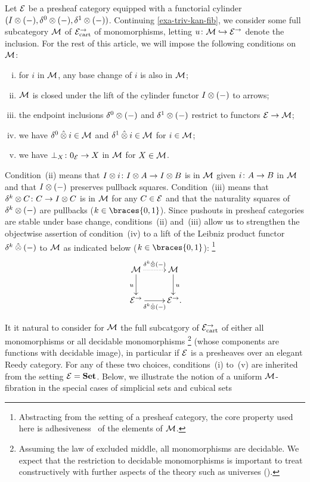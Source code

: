 \documentclass[reqno,10pt,a4paper,oneside,draft]{amsart}
\begin{document}
\begin{example} \label{uniform-fib-presheaf-cat}
Let $\catE$ be a presheaf category equipped with a functorial cylinder $(\interval \otimes (-), \lcyl \otimes (-), \rcyl \otimes (-))$.
Continuing \cref{exa-triv-kan-fib}, we consider some full subcategory $\cal{M}$ of $\catE_\cart^\to$ of monomorphisms, letting $u \co \cal{M} \hookrightarrow \catE^\to$ denote the inclusion.
For the rest of this article, we will impose the following conditions on $\cal{M}$:
\begin{enumerate}[(i)]
\item for $i$ in $\cal{M}$, any base change of $i$ is also in $\cal{M}$;
\item $\cal{M}$ is closed under the lift of the cylinder functor $\interval \otimes (-)$ to arrows;
\item the endpoint inclusions $\lcyl \otimes (-)$ and $\rcyl \otimes (-)$ restrict to functors $\catE \to \cal{M}$;
\item we have $\lcyl \hatotimes i \in \cal{M}$ and $\rcyl \hatotimes i \in \cal{M}$ for $i \in \cal{M}$;
\item we have $\bot_X \co 0_{\cal{E}} \to X$ in $\cal{M}$ for $X \in \cal{M}$.
\end{enumerate}
Condition~(ii) means that $\interval \otimes i \co \interval \otimes A \to \interval \otimes B$ is in $\cal{M}$ given $i \co A \to B$ in $\cal{M}$ and that $\interval \otimes (-)$ preserves pullback squares.
Condition~(iii) means that $\kcyl \otimes C \co C \to \interval \otimes C$ is in $\cal{M}$ for any $C \in \catE$ and that the naturality squares of $\kcyl \otimes (-)$ are pullbacks ($k \in \braces{0, 1}$).
Since pushouts in presheaf categories are stable under base change, conditions~(ii) and~(iii) allow us to strengthen the objectwise assertion of condition~(iv) to a lift of the Leibniz product functor $\kcyl \hatotimes (-)$ to $\cal{M}$ as indicated below ($k \in \braces{0, 1}$):%
\footnote{Abstracting from the setting of a presheaf category, the core property used here is adhesiveness~\cite{garner-lack:adhesive} of the elements of $\cal{M}$.}
\[
\xymatrix{
  \cal{M}
  \ar@{.>}[r]^{\kcyl \hatotimes (-)}
  \ar[d]_{u}
&
  \cal{M}
  \ar[d]^{u}
\\
  \catE^\to
  \ar[r]_{\kcyl \hatotimes (-)}
&
  \catE^\to
\rlap{.}}
\]

It it natural to consider for $\cal{M}$ the full subcatgory of $\catE_\cart^\to$ of either all monomorphisms or all decidable monomorphisms%
\footnote{
Assuming the law of excluded middle, all monomorphisms are decidable.
We expect that the restriction to decidable monomorphisms is important to treat constructively with further aspects of the theory such as universes (\cf \cite{cohen-et-al:cubicaltt}).
} (\ie whose components are functions with decidable image), in particular if $\calE$ is a presheaves over an elegant Reedy category.
For any of these two choices, conditions~(i) to~(v) are inherited from the setting $\calE = \Set$.
Below, we illustrate the notion of a uniform $\cal{M}$-fibration in the special cases of simplicial sets and cubical sets
\end{example}
\end{document}
